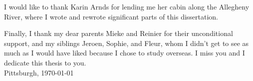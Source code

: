 I would like to thank Karin Arnds for lending me her cabin along the Allegheny River, where I wrote and rewrote significant parts of this dissertation.

Finally, I thank my dear parents Mieke and Reinier for their unconditional support, and my siblings Jeroen, Sophie, and Fleur, whom I didn't get to see as much as I would have liked because I chose to study overseas. I miss you and I dedicate this thesis to you.\\[2em]


\noindent \hfill Pittsburgh, \today
